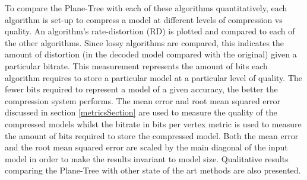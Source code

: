 To compare the Plane-Tree with each of these algorithms quantitatively, each algorithm is set-up to compress a model at different levels of compression vs quality. An algorithm's rate-distortion (RD) is plotted and compared to each of the other algorithms. Since lossy algorithms are compared, this indicates the amount of distortion (in the decoded model compared with the original) given a particular bitrate. This measurement represents the amount of bits each algorithm requires to store a particular model at a particular level of quality. The fewer bits required to represent a model of a given accuracy, the better the compression system performs. The mean error and root mean squared error discussed in section \ref{metricsSection} are used to measure the quality of the compressed models whilst the bitrate in bits per vertex metric is used to measure the amount of bits required to store the compressed model. Both the mean error and the root mean squared error are scaled by the main diagonal of the input model in order to make the results invariant to model size. Qualitative results comparing the Plane-Tree with other state of the art methods are also presented. \\


